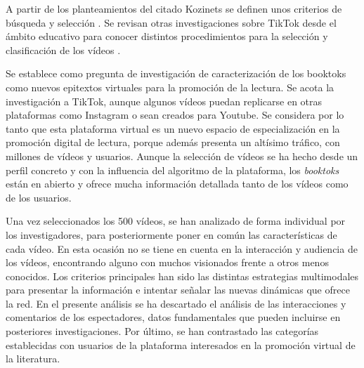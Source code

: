 A partir de los planteamientos del citado Kozinets se definen unos
criterios de búsqueda y selección \cite{turpogenebra2008}. Se revisan
otras investigaciones sobre TikTok desde el ámbito educativo para
conocer distintos procedimientos para la selección y clasificación de
los vídeos \cite{tejedorcalvo2022,yélamosguerra2022,caldeiro2023}.

Se establece como pregunta de investigación de caracterización de los
booktoks como nuevos epitextos virtuales para la promoción de la
lectura. Se acota la investigación a TikTok, aunque algunos vídeos
puedan replicarse en otras plataformas como Instagram o sean creados
para Youtube. Se considera por lo tanto que esta plataforma virtual es
un nuevo espacio de especialización en la promoción digital de lectura,
porque además presenta un altísimo tráfico, con millones de vídeos y
usuarios. Aunque la selección de vídeos se ha hecho desde un perfil
concreto y con la influencia del algoritmo de la plataforma, los
\emph{booktoks} están en abierto y ofrece mucha información detallada
tanto de los vídeos como de los usuarios.

Una vez seleccionados los 500 vídeos, se han analizado de forma
individual por los investigadores, para posteriormente poner en común
las características de cada vídeo. En esta ocasión no se tiene en cuenta
en la interacción y audiencia de los vídeos, encontrando alguno con
muchos visionados frente a otros menos conocidos. Los criterios
principales han sido las distintas estrategias multimodales para
presentar la información e intentar señalar las nuevas dinámicas que
ofrece la red. En el presente análisis se ha descartado el análisis de
las interacciones y comentarios de los espectadores, datos fundamentales
que pueden incluirse en posteriores investigaciones. Por último, se han
contrastado las categorías establecidas con usuarios de la plataforma
interesados en la promoción virtual de la literatura.

